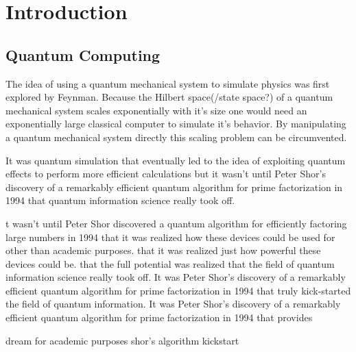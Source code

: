 \chapter{Introduction}

\section{Quantum Computing}

The idea of using a quantum mechanical system to simulate physics was first explored by Feynman\cite{Feynman1982Simulating}. Because the Hilbert space(/state space?)  of a quantum mechanical system scales  exponentially with it's size one would need an exponentially large classical computer to simulate it's behavior. By manipulating a quantum mechanical system directly this scaling problem can be circumvented.

It was quantum simulation that eventually led to the idea of exploiting quantum effects to perform more efficient calculations but it wasn't until Peter Shor's discovery of a remarkably efficient quantum algorithm for prime factorization in 1994 \cite{Shor1994Algorithms} that quantum information science really took off.

t wasn't until Peter Shor discovered a quantum algorithm for efficiently factoring large numbers in 1994\cite{Shor1994Algorithms} that it was realized how these devices could be used for other than academic purposes.
 that it was realized just how powerful these devices could be.
  that the full potential was realized
  that the field of quantum information science really took off.
It was Peter Shor's discovery of a remarkably efficient quantum algorithm for prime factorization in 1994 \cite{Shor1994Algorithms} that truly kick-started the field of quantum information.
It was Peter Shor's discovery of a remarkably efficient quantum algorithm for prime factorization in 1994 \cite{Shor1994Algorithms} that provides


dream for academic purposes
shor's algorithm kickstart





